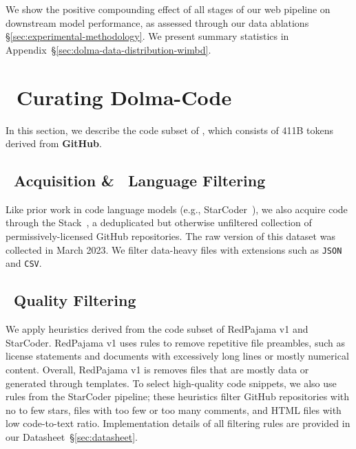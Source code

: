 We show the positive compounding effect of all stages of our web pipeline on downstream model performance, as assessed through our data ablations \S\ref{sec:experimental-methodology}.
We present summary statistics in Appendix~\S\ref{sec:dolma-data-distribution-wimbd}.























\section{\dolmaCode~Curating Dolma-Code}
\label{sec:curating-dolma-code}

In this section, we describe the code subset of \dolma, which consists of 411B tokens derived from \textbf{GitHub}.

\subsection{\toolkitWget~Acquisition \& \toolkitFilter~Language Filtering}

Like prior work in code language models (e.g., StarCoder~\citep{Li2023StarCoderMT}), we also acquire code through the Stack~\citep{kocetkov2022stack}, a deduplicated but otherwise unfiltered collection of permissively-licensed GitHub repositories.
The raw version of this dataset was collected in March 2023.
We filter data-heavy 
files with extensions such as \texttt{JSON} and \texttt{CSV}.


\subsection{\toolkitFilter~Quality Filtering} 

We apply heuristics derived from the code subset of RedPajama v1 and StarCoder. 
RedPajama v1 uses rules to remove repetitive file preambles, such as license statements
and documents with excessively long lines or mostly numerical content. 
Overall, RedPajama v1 is removes files that are mostly data or generated through templates.
To select high-quality code snippets, we also use rules from the StarCoder pipeline;
these heuristics filter GitHub repositories with no to few stars, files with too few or too many comments, and HTML files with low code-to-text ratio.
Implementation details of all filtering rules are provided in our Datasheet~\S\ref{sec:datasheet}.



